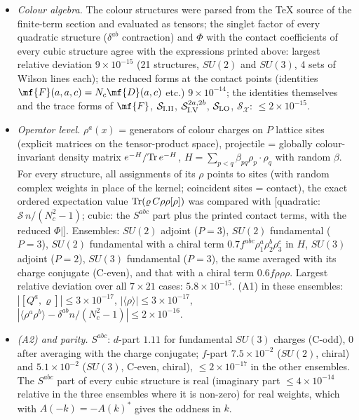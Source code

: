 \begin{itemize}
\item \emph{Colour algebra.} The colour structures were parsed from the TeX source of the finite-term section and evaluated as tensors; the singlet factor of every quadratic structure ($\delta^{ab}$ contraction) and $\Phi$ with the contact coefficients of every cubic structure agree with the expressions printed above: largest relative deviation $9\times10^{-15}$ (21 structures, $SU(2)$ and $SU(3)$, 4 sets of Wilson lines each); the reduced forms at the contact points (identities $\mf{F}(a,a,c)=N_{c}\mf{D}(a,c)$ etc.) $9\times10^{-14}$; the identities themselves and the trace forms of $\mf{F}$, $\mathcal{S}_{\rm I.II}$, $\mathcal{S}^{2a,2b}_{\rm I.V}$, $\mathcal{S}_{\rm LO}$, $\mathcal{S}_{\mathcal{X}}$: $\le2\times10^{-15}$.
\item \emph{Operator level.} $\rho^{a}(x)$ = generators of colour charges on $P$ lattice sites (explicit matrices on the tensor-product space), projectile = globally colour-invariant density matrix $e^{-H}/{\rm Tr}\,e^{-H}$, $H=\sum_{p<q}\beta_{pq}\rho_{p}\cdot\rho_{q}$ with random $\beta$. For every structure, all assignments of its $\rho$ points to sites (with random complex weights in place of the kernel; coincident sites = contact), the exact ordered expectation value ${\rm Tr}(\varrho\,C\rho\rho[\rho])$ was compared with [quadratic: $\mathcal{S}\,n/(N_{c}^{2}-1)$; cubic: the $S^{abc}$ part plus the printed contact terms, with the reduced $\Phi|$]. Ensembles: $SU(2)$ adjoint ($P=3$), $SU(2)$ fundamental ($P=3$), $SU(2)$ fundamental with a chiral term $0.7f^{abc}\rho^{a}_{1}\rho^{b}_{2}\rho^{c}_{3}$ in $H$, $SU(3)$ adjoint ($P=2$), $SU(3)$ fundamental ($P=3$), the same averaged with its charge conjugate (C-even), and that with a chiral term $0.6f\rho\rho\rho$. Largest relative deviation over all $7\times21$ cases: $5.8\times10^{-15}$. (A1) in these ensembles: $|[Q^{a},\varrho]|\le3\times10^{-17}$, $|\langle\rho\rangle|\le3\times10^{-17}$, $|\langle\rho^{a}\rho^{b}\rangle-\delta^{ab}n/(N_{c}^{2}-1)|\le2\times10^{-16}$.
\item \emph{(A2) and parity.} $S^{abc}$: $d$-part $1.11$ for fundamental $SU(3)$ charges (C-odd), $0$ after averaging with the charge conjugate; $f$-part $7.5\times10^{-2}$ ($SU(2)$, chiral) and $5.1\times10^{-2}$ ($SU(3)$, C-even, chiral), $\le2\times10^{-17}$ in the other ensembles. The $S^{abc}$ part of every cubic structure is real (imaginary part $\le4\times10^{-14}$ relative in the three ensembles where it is non-zero) for real weights, which with $A(-k)=-A(k)^{*}$ gives the oddness in $k$.

\end{itemize}
